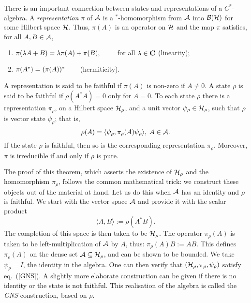 There is an important connection between states and representations
of a $C^*$-algebra. A {\em representation} $\pi$ of ${\cal A}$ is
a $^*$-homomorphism from ${\cal A}$ into ${\cal B}({\cal H})$
for some Hilbert space ${\cal H}$. Thus, $\pi(A)$ is an operator on
${\cal H}$ and the map $\pi$ satisfies, for all $A,B\in{\cal A}$,
\begin{enumerate}
\item $\pi(\lambda A+B)=\lambda\pi(A)+\pi(B),\hspace{.3in}$ for all $\lambda
\in{\bf C}$ (linearity);
\item $\pi(A^*)=(\pi(A))^*\hspace{.3in}$(hermiticity).
\end{enumerate}
A representation is said to be faithful if $\pi(A)$ is
non-zero if $A\neq 0$. A state $\rho$ is said to be faithful if $\rho
(A^*A)=0$ only for $A=0$. To each state $\rho$ there is a representation
$\pi_\rho$, on a Hilbert space ${\cal H}_\rho$, and a unit vector $\psi_\rho
\in{\cal H}_\rho$, such that $\rho$ is vector state $\psi_\rho$; that is,
\begin{equation}
\rho(A)=\langle\psi_\rho,\pi_\rho(A)\psi_\rho\rangle,\;A\in{\cal A}.
\label{GNS}
\end{equation}
If the state $\rho$ is faithful, then so is the corresponding representation
$\pi_\rho$. Moreover, $\pi$ is irreducible if and only if $\rho$ is pure.

The proof of this theorem, which asserts the existence of ${\cal H}_\rho$
and the homomorphism $\pi_\rho$, follows the common mathematical trick:
we construct these objects out of the material at hand. Let us do this
when ${\cal A}$ has an identity and $\rho$ is faithful. We start with
the vector space ${\cal A}$ and provide it with the scalar product
\[\langle A,B\rangle:=\rho(A^*B).\]
The completion of this space is then taken to be ${\cal H}_\rho$. The
operator $\pi_\rho(A)$ is taken to be left-multiplication of ${\cal A}$
by $A$, thus: $\pi_\rho(A)B:=AB$. This defines $\pi_\rho(A)$ on the
dense set ${\cal A}\subseteq{\cal H}_\rho$, and can be shown to be bounded.
We take $\psi_\rho=I$, the identity in the algebra. One can then verify
that $({\cal H}_\rho,\pi_\rho,\psi_\rho)$ satisfy eq.~(\ref{GNS}).
A slightly more elaborate construction can be given if there is no identity
or the state is not faithful.
This realisation of the algebra is called the {\em GNS} construction, based on
$\rho$.

